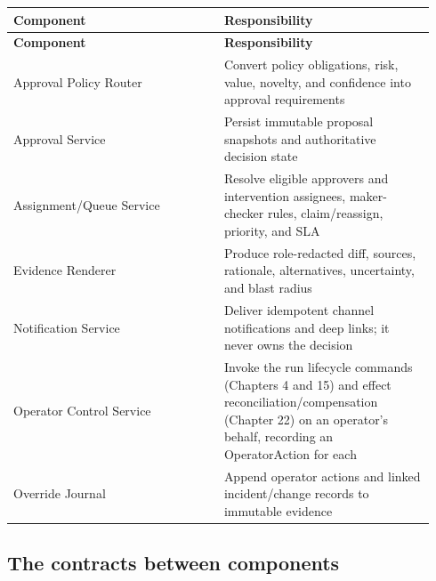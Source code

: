 \BookTableStart
\small
\begin{longtable}{@{}Y{0.4700\linewidth}Y{0.4700\linewidth}@{}}
\color{white}\bfseries \textbf{Component} & \color{white}\bfseries \textbf{Responsibility} \\
\endfirsthead
{}
\color{white}\bfseries \textbf{Component} & \color{white}\bfseries \textbf{Responsibility} \\
\endhead
Approval Policy Router & Convert policy obligations, risk, value, novelty, and confidence into approval requirements \\
Approval Service & Persist immutable proposal snapshots and authoritative decision state \\
Assignment/Queue Service & Resolve eligible approvers and intervention assignees, maker-checker rules, claim/reassign, priority, and SLA \\
Evidence Renderer & Produce role-redacted diff, sources, rationale, alternatives, uncertainty, and blast radius \\
Notification Service & Deliver idempotent channel notifications and deep links; it never owns the decision \\
Operator Control Service & Invoke the run lifecycle commands (Chapters 4 and 15) and effect reconciliation/compensation (Chapter 22) on an operator's behalf, recording an OperatorAction for each \\
Override Journal & Append operator actions and linked incident/change records to immutable evidence \\
\end{longtable}
\BookTableEnd

\subsection{The contracts between components}

